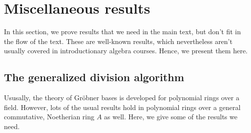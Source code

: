 \section{Miscellaneous results}
In this section, we prove results that we need in the main text, but don't fit in the flow of the text. These are well-known results, which nevertheless aren't usually covered in introductionary algebra courses. Hence, we present them here.

\subsection{The generalized division algorithm}\label{app:pseudo}
Ususally, the theory of Gröbner bases is developed for polynomial rings over a field. However, lots of the usual results hold in polynomial rings over a general commutative, Noetherian ring $A$ as well. Here, we give some of the results we need.

